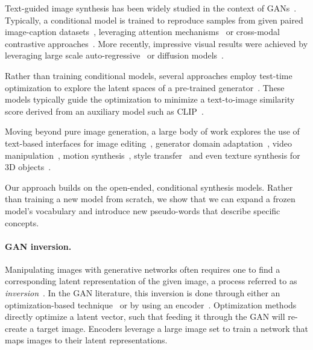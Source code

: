 Text-guided image synthesis has been widely studied in the context of GANs~\citep{goodfellow2014generative}. Typically, a conditional model is trained to reproduce samples from given paired image-caption datasets~\citep{zhu2019dm,tao2020df}, leveraging attention mechanisms~\citep{xu2018attngan} or cross-modal contrastive approaches~\citep{zhang2021cross,ye2021improving}. More recently, impressive visual results were achieved by leveraging large scale auto-regressive~\citep{ramesh2021zero,yu2022scaling} or diffusion models~\citep{ramesh2022hierarchical,saharia2022photorealistic,nichol2021glide,rombach2021highresolution}.

Rather than training conditional models, several approaches employ test-time optimization to explore the latent spaces of a pre-trained generator~\citep{crowson2022vqgan,murdock2021bigsleep,crowson2021diffusion}. These models typically guide the optimization to minimize a text-to-image similarity score derived from an auxiliary model such as CLIP~\citep{radford2021learning}.

Moving beyond pure image generation, a large body of work explores the use of text-based interfaces for image editing~\citep{patashnik2021styleclip,abdal2021clip2stylegan,avrahami2022blended}, generator domain adaptation~\citep{gal2021stylegan,kim2022diffusionclip}, video manipulation~\citep{tzaban2022stitch,bar2022text2live}, motion synthesis~\citep{tevet2022motionclip,petrovich22temos}, style transfer~\citep{kwon2021clipstyler,liu2022name} and even texture synthesis for 3D objects~\citep{text2mesh}.

Our approach builds on the open-ended, conditional synthesis models. Rather than training a new model from scratch, we show that we can expand a frozen model's vocabulary and introduce new pseudo-words that describe specific concepts. 

\paragraph{GAN inversion.} Manipulating images with generative networks often requires one to find a corresponding latent representation of the given image, a process referred to as \textit{inversion}~\citep{zhu2016generative,xia2021gan}.
In the GAN literature, this inversion is done through either an optimization-based technique~\citep{abdal2019image2stylegan,abdal2020image2stylegan++,zhu2020improved,gu2020image} or by using an encoder~\citep{richardson2020encoding,zhu2020domain,pidhorskyi2020adversarial,tov2021designing}. Optimization methods directly optimize a latent vector, such that feeding it through the GAN will re-create a target image. Encoders leverage a large image set to train a network that maps images to their latent representations. 


